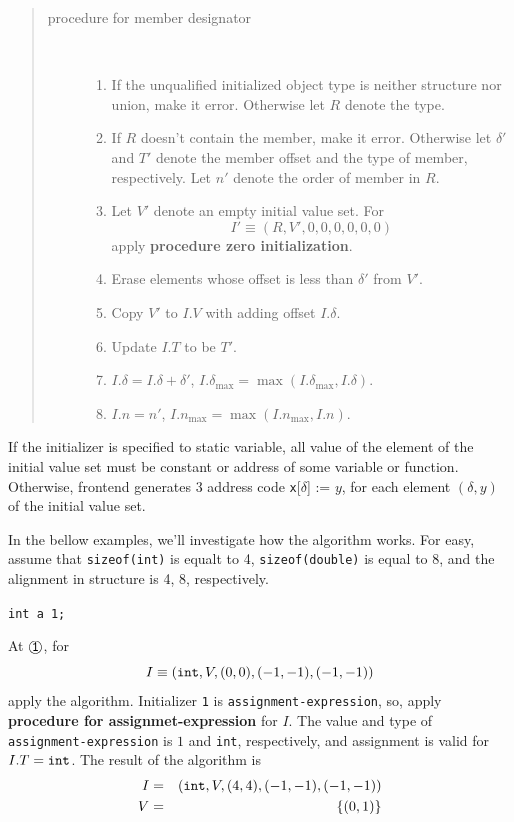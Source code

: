 \begin{quotation}
\begin{description}
\item[procedure for member designator]

\

\begin{enumerate}
\item If the unqualified initialized object type is neither
      structure nor union, make it error. Otherwise
      let $R$ denote the type.
\item If $R$ doesn't contain the member, make it error.
      Otherwise let ${\delta}'$ and $T'$ denote the member offset
      and the type of member, respectively. Let $n'$
      denote the order of member in $R$.
\item Let $V'$ denote an empty
      initial value set. For
\[
 I' \equiv (R,V',0,0,0,0,0,0)
\]
apply {\bf procedure zero initialization}.

\item Erase elements whose offset is less than ${\delta}'$
from $V'$. 

\item Copy $V'$ to $I.V$ with adding offset $I.\delta$.

\item Update $I.T$ to be $T'$.
\item $I.\delta = I.\delta + \delta'$,
      $I.{\delta_{\max}} = {\max}(I.{\delta_{\max}},I.{\delta})$.
\item $I.n = n'$, $I.n_{\max} = \max(I.n_{\max},I.n)$.
\end{enumerate}

\end{description}
\end{quotation}

If the initializer is specified to static variable,
all value of the element of the initial value set must be 
constant or address of some variable or function.
Otherwise, frontend generates 3 address code
{\tt{x}}[$\delta$] := $y$, 
for each element $(\delta,y)$ of the initial value set.

In the bellow examples, we'll investigate how the algorithm
works. For easy, assume that {\tt{sizeof(int)}} is equalt to 4,
 {\tt{sizeof(double)}} is equal to 8, and the alignment in 
structure is 4, 8, respectively.

\begin{Example}
\label{initializer000}
{{\tt int a  1;}}

\noindent
At $\MARU{\tt 1}$, for
\[
I \equiv ({\tt{int}},V,(0,0),(-1,-1),(-1,-1))
\]
apply the algorithm. Initializer {\tt 1}
is {\tt assignment-expression}, so,
apply  {\bf procedure for assignmet-expression} for $I$.
The value and type of \\
{\tt assignment-expression} is $1$ and {\tt{int}},
respectively, and assignment is valid for $I.T = {\tt{int}}$.
The result of the algorithm is
\begin{eqnarray*}
I & = & ({\tt{int}},V,(4,4),(-1,-1),(-1,-1)) \\
V & = & \{(0,1)\}
\end{eqnarray*}
\end{Example}

